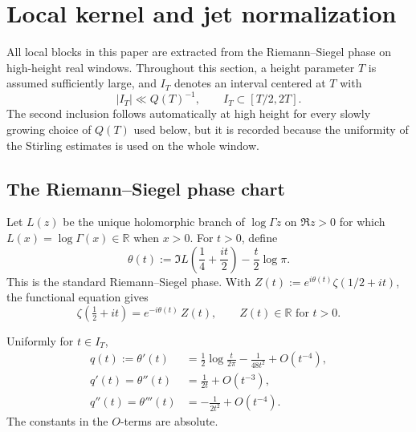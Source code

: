 \section{Local kernel and jet normalization}
\label{sec:local-kernel-and-jet-normalization}
\quad
{}\quad
{}\quad
{}\quad
{}\quad
{}
\par\medskip

All local blocks in this paper are extracted from the Riemann--Siegel
phase on high-height real windows.  Throughout this section, a height
parameter \(T\) is assumed sufficiently large, and \(I_T\) denotes an
interval centered at \(T\) with
\[
        |I_T|\ll Q(T)^{-1},
        \qquad I_T\subset [T/2,2T].
\]
The second inclusion follows automatically at high height for every
slowly growing choice of \(Q(T)\) used below, but it is recorded
because the uniformity of the Stirling estimates is used on the whole
window.

\subsection{The Riemann--Siegel phase chart}
\label{subsec:local-phase-chart}

\begin{definition}
\label{def:riemann-siegel-phase}
Let \(L(z)\) be the unique holomorphic branch of \(\log\Gamma z\) on
\(\Re z>0\) for which \(L(x)=\log\Gamma(x)\in\mathbb R\) when \(x>0\).
For \(t>0\), define
\begin{equation}
\label{eq:theta-definition}
 \theta(t)
 := \Im L\!\left(\frac14+\frac{it}{2}\right)
    -\frac{t}{2}\log\pi.
\end{equation}
This is the standard Riemann--Siegel phase.  With
\(Z(t):=e^{i\theta(t)}\zeta(1/2+it)\), the functional equation gives
\[
        \zeta\!\left(\tfrac12+it\right)
        =e^{-i\theta(t)}\,Z(t),
        \qquad Z(t)\in\mathbb R \text{ for } t>0.
\]
\end{definition}

\begin{lemma}
\label{lem:theta-derivative-asymptotics}
Uniformly for \(t\in I_T\),
\begin{align}
\label{eq:theta-derivative-asymptotics}
q(t):=\theta'(t)
&=\frac12\log\frac{t}{2\pi}-\frac{1}{48 t^2}+O(t^{-4}),\\
q'(t)=\theta''(t)
&=\frac{1}{2t}+O(t^{-3}),\\
q''(t)=\theta'''(t)
&=-\frac{1}{2t^2}+O(t^{-4}).
\end{align}
The constants in the \(O\)-terms are absolute.
\end{lemma}

